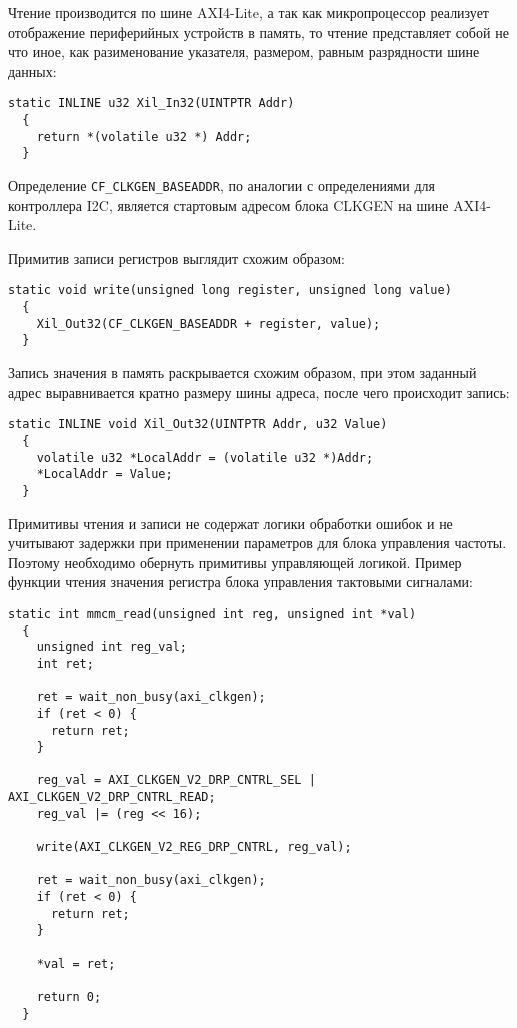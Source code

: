 Чтение производится по шине AXI4-Lite, а так как микропроцессор реализует
отображение периферийных устройств в память, то чтение представляет собой не что иное,
как разименование указателя, размером, равным разрядности шине данных:
\medskip
\begin{lstlisting}[style=C]
  static INLINE u32 Xil_In32(UINTPTR Addr)
  {
	return *(volatile u32 *) Addr;
  }
\end{lstlisting}
\medskip

Определение \texttt{CF\_CLKGEN\_BASEADDR}, по аналогии с определениями для
контроллера I2C, является стартовым адресом блока CLKGEN на шине AXI4-Lite.

Примитив записи регистров выглядит схожим образом:
\medskip
\begin{lstlisting}[style=C]
  static void write(unsigned long register, unsigned long value)
  {
	Xil_Out32(CF_CLKGEN_BASEADDR + register, value);
  }
\end{lstlisting}
\medskip

Запись значения в память раскрывается схожим образом, при этом
заданный адрес выравнивается кратно размеру шины адреса, после
чего происходит запись:
\medskip
\begin{lstlisting}[style=C]
  static INLINE void Xil_Out32(UINTPTR Addr, u32 Value)
  {
	volatile u32 *LocalAddr = (volatile u32 *)Addr;
	*LocalAddr = Value;
  }
\end{lstlisting}
\medskip

Примитивы чтения и записи не содержат логики обработки ошибок и не учитывают
задержки при применении параметров для блока управления частоты. Поэтому
необходимо обернуть примитивы управляющей логикой. Пример функции чтения
значения регистра блока управления тактовыми сигналами:
\medskip
\begin{lstlisting}[style=C]
  static int mmcm_read(unsigned int reg, unsigned int *val)
  {
	unsigned int reg_val;
	int ret;

	ret = wait_non_busy(axi_clkgen);
	if (ret < 0) {
      return ret;
    }

	reg_val = AXI_CLKGEN_V2_DRP_CNTRL_SEL | AXI_CLKGEN_V2_DRP_CNTRL_READ;
	reg_val |= (reg << 16);

	write(AXI_CLKGEN_V2_REG_DRP_CNTRL, reg_val);

	ret = wait_non_busy(axi_clkgen);
	if (ret < 0) {
      return ret;
    }

	*val = ret;

	return 0;
  }
\end{lstlisting}
\medskip

